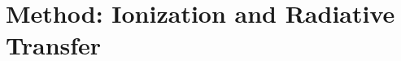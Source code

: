 \documentclass[useAMS,usenatbib]{mn2e_x}
\begin{document}









\section{Method: Ionization and Radiative Transfer}
\end{document}
